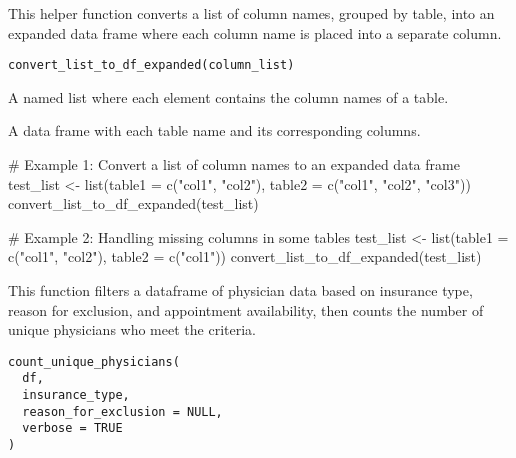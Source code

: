 \documentclass[a4paper]{book}
\begin{document}
%
\begin{Description}
This helper function converts a list of column names, grouped by table, into an expanded data frame
where each column name is placed into a separate column.
\end{Description}
%
\begin{Usage}
\begin{verbatim}
convert_list_to_df_expanded(column_list)
\end{verbatim}
\end{Usage}
%
\begin{Arguments}
\begin{ldescription}
\item[\code{column\_list}] A named list where each element contains the column names of a table.
\end{ldescription}
\end{Arguments}
%
\begin{Value}
A data frame with each table name and its corresponding columns.
\end{Value}
%
\begin{Examples}
\begin{ExampleCode}
# Example 1: Convert a list of column names to an expanded data frame
test_list <- list(table1 = c("col1", "col2"), table2 = c("col1", "col2", "col3"))
convert_list_to_df_expanded(test_list)

# Example 2: Handling missing columns in some tables
test_list <- list(table1 = c("col1", "col2"), table2 = c("col1"))
convert_list_to_df_expanded(test_list)
\end{ExampleCode}
\end{Examples}
%
\begin{Description}
This function filters a dataframe of physician data based on insurance type, reason for exclusion,
and appointment availability, then counts the number of unique physicians who meet the criteria.
\end{Description}
%
\begin{Usage}
\begin{verbatim}
count_unique_physicians(
  df,
  insurance_type,
  reason_for_exclusion = NULL,
  verbose = TRUE
)
\end{verbatim}
\end{Usage}
\end{document}
